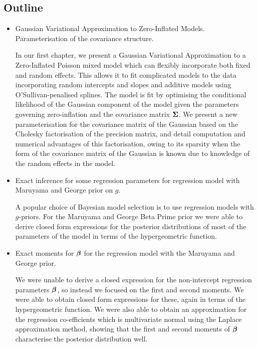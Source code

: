 \documentclass{amsart}[12pt]
\begin{document}
\subsection{Outline}
\begin{itemize}
	\item Gaussian Variational Approximation to Zero-Inflated Models. Parameterisation of the covariance structure.

	In our first chapter, we present a Gaussian Variational Approximation to a Zero-Inflated Poisson mixed model
	which can flexibly incorporate both fixed and random effects. This allows it to fit complicated models
	to the data incorporating random intercepts and slopes and additive models using O'Sullivan-penalised splines.
	The model is fit by optimising the conditional likelihood of the Gaussian component of the model given the
	parameters governing zero-inflation and the covariance matrix ${\boldsymbol \Sigma}$.
	We present a new parameterisation for the covariance matrix of the Gaussian based on the Cholesky
	factorisation of the precision matrix, and detail computation and numerical advantages of this
	factorisation, owing to its sparsity when the form of the covariance matrix of the Gaussian is known due to
	knowledge of the random effects in the model.

	\item Exact inference for some regression parameters for regression model with Maruyama and George prior on $g$.

	A popular choice of Bayesian model selection is to use regression models with $g$-priors. For the Maruyama
	and George Beta Prime prior \citep{Maruyama2011} we were able to derive closed form expressions for the
	posterior distributions of most of the parameters of the model in terms of the hypergeometric function.

	\item Exact moments for ${\boldsymbol \beta}$ for the regression model with the Maruyama and George prior.

	We were unable to derive a closed expression for the non-intercept regression parameters ${\boldsymbol \beta}$, so instead
	we focused on the first and second moments. We were able to obtain closed form expressions for these,
	again in terms of the hypergeometric function. We were also able to obtain an approximation for the
	regression co-efficients which is multivariate normal using the Laplace approximation method, showing
	that the first and second moments of ${\boldsymbol \beta}$ characterise the posterior distribution well.


\end{itemize}
\end{document}
